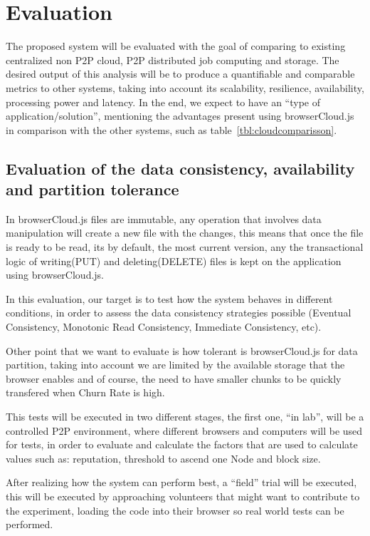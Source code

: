 
% 
% 

\section{Evaluation}

The proposed system will be evaluated with the goal of comparing to existing centralized non P2P cloud, P2P distributed job computing and storage. The desired output of this analysis will be to produce a quantifiable and comparable metrics to other systems, taking into account its scalability, resilience, availability, processing power and latency. In the end, we expect to have an ``type of application/solution'', mentioning the advantages present using browserCloud.js in comparison with the other systems, such as table~\ref{tbl:cloudcomparisson}.


\subsection{Evaluation of the data consistency, availability and partition tolerance}

In browserCloud.js files are immutable, any operation that involves data manipulation will create a new file with the changes, this means that once the file is ready to be read, its by default, the most current version, any the transactional logic of writing(PUT) and deleting(DELETE) files is kept on the application using browserCloud.js. 

In this evaluation, our target is to test how the system behaves in different conditions, in order to assess the data consistency strategies possible (Eventual Consistency, Monotonic Read Consistency, Immediate Consistency, etc).

Other point that we want to evaluate is how tolerant is browserCloud.js for data partition, taking into account we are limited by the available storage that the browser enables and of course, the need to have smaller chunks to be quickly transfered when Churn Rate is high.

This tests will be executed in two different stages, the first one, ``in lab'', will be a controlled P2P environment, where different browsers and computers will be used for tests, in order to evaluate and calculate the factors that are used to calculate values such as: reputation, threshold to ascend one Node and block size. 

After realizing how the system can perform best, a ``field'' trial will be executed, this will be executed by approaching volunteers that might want to contribute to the experiment, loading the code into their browser so real world tests can be performed.


